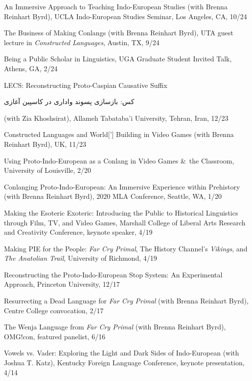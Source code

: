 \documentclass[paper=letter,fontsize=11pt,enabledeprecatedfontcommands]{scrartcl} %
\newcommand{\TalkEntry}[4]{
		\noindent #1, #2, #3 #4}
\begin{document}
\begin{etaremune}
\item\TalkEntry{An Immersive Approach to Teaching Indo-European Studies (with Brenna Reinhart Byrd)}{UCLA Indo-European Studies Seminar, Los Angeles, CA}{10/24}
\item\TalkEntry{The Business of Making Conlangs (with Brenna Reinhart Byrd)}{UTA guest lecture in \textit{Constructed Languages}, Austin, TX}{9/24}
\item\TalkEntry{Being a Public Scholar in Linguistics}{UGA Graduate Student Invited Talk, Athens, GA}{2/24}
\item\TalkEntry{LECS: Reconstructing Proto-Caspian Causative Suffix \begin{otherlanguage}{farsi} کس: بازسازی پسوند واداری در کاسپین آغازی \end{otherlanguage}(with Zia Khoshsirat)}{Allameh Tabataba'i University, Tehran, Iran}{12/23}
\item\TalkEntry{Constructed Languages and World['] Building in Video Games (with Brenna Reinhart Byrd)}{UK}{11/23}
\item\TalkEntry{Using Proto-Indo-European as a Conlang in Video Games \&~the Classroom}{University of Louisville}{2/20}
\item\TalkEntry{Conlanging Proto-Indo-European: An Immersive Experience within Prehistory (with Brenna Reinhart Byrd)}{2020 MLA Conference, Seattle, WA}{1/20}
\item\TalkEntry{Making the Esoteric Exoteric: Introducing the Public to Historical Linguistics through Film, TV, and Video Games}{Marshall College of Liberal Arts Research and Creativity Conference, keynote speaker}{4/19}
\item\TalkEntry{Making PIE for the People: {\it Far Cry Primal}, The History Channel's {\it Vikings}, and {\textit{The Anatolian Trail}}}{University of Richmond}{4/19}
\item\TalkEntry{Reconstructing the Proto-Indo-European Stop System: An Experimental Approach}{Princeton University}{12/17}
\item\TalkEntry{Resurrecting a Dead Language for \textit{Far Cry Primal} (with Brenna Reinhart Byrd)}{Centre College convocation}{2/17}
\item\TalkEntry{The Wenja Language from \textit{Far Cry Primal} (with Brenna Reinhart Byrd)}{OMG!con, featured panelist}{6/16}
\item\TalkEntry{Vowels vs. Vader: Exploring the Light and Dark Sides of Indo-European (with Joshua T. Katz)}{Kentucky Foreign Language Conference, keynote presentation}{4/14}

\end{etaremune}
\end{document}
